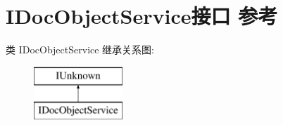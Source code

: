 \hypertarget{interface_i_doc_object_service}{}\section{I\+Doc\+Object\+Service接口 参考}
\label{interface_i_doc_object_service}
类 I\+Doc\+Object\+Service 继承关系图\+:\begin{figure}[H]
\begin{center}
\leavevmode
\includegraphics[height=2.000000cm]{interface_i_doc_object_service}
\end{center}
\end{figure}
